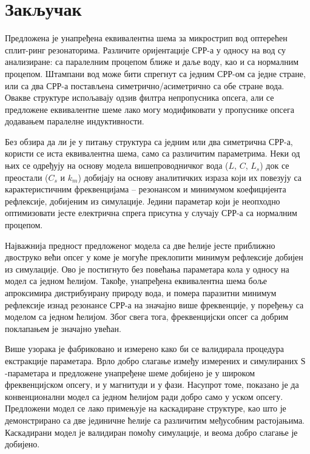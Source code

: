 \documentclass[main.tex]{subfiles}
\begin{document}
\section{Закључак}
Предложена је унапређена еквивалентна шема за микрострип вод оптерећен сплит-ринг резонаторима. Различите оријентације СРР-а у односу на вод су анализиране: са паралелним процепом ближе и даље воду, као и са нормалним процепом. Штампани вод може бити спрегнут са једним СРР-ом са једне стране, или са два СРР-а постављена симетрично/асиметрично са обе стране вода. Овакве структуре испољавају одзив филтра непропусника опсега, али се предложене еквивалентне шеме лако могу модификовати у пропуснике опсега додавањем паралелне индуктивности.

Без обзира да ли је у питању структура са једним или два симетрична СРР-а, користи се иста еквивалентна шема, само са различитим параметрима. Неки од њих се одређују на основу модела вишепроводничког вода ($L$, $C$, $L_s$) док се преостали ($C_s$ и $k_m$) добијају на основу аналитичких израза који их повезују са карактеристичним фреквенцијама -- резонансом и минимумом коефицијента рефлексије, добијеним из симулације. Једини параметар који је неопходно оптимизовати јесте електрична спрега присутна у случају СРР-а са нормалним процепом.

Најважнија предност предложеног модела са две ћелије јесте приближно двоструко већи опсег у коме је могуће преклопити минимум рефлексије добијен из симулације. Ово је постигнуто без повећања параметара кола у односу на модел са једном ћелијом. Такође, унапређена еквивалентна шема боље апроксимира дистрибуирану природу вода, и помера паразитни минимум рефлексије изнад резонансе СРР-а на значајно више фреквенције, у поређењу са моделом са једном ћелијом. Због свега тога, фреквенцијски опсег са добрим поклапањем је значајно увећан.

Више узорака је фабриковано и измерено како би се валидирала процедура екстракције параметара. Врло добро слагање између измерених и симулираних $Ѕ$-параметара и предложене унапређене шеме добијено је у широком фреквенцијском опсегу, и у магнитуди и у фази. Насупрот томе, показано је да конвенционални модел са једном ћелијом ради добро само у уском опсегу. Предложени модел се лако примењује на каскадиране структуре, као што је демонстрирано са две јединичне ћелије са различитим међусобним растојањима. Каскадирани модел је валидиран помоћу симулације, и веома добро слагање је добијено.
\end{document}
